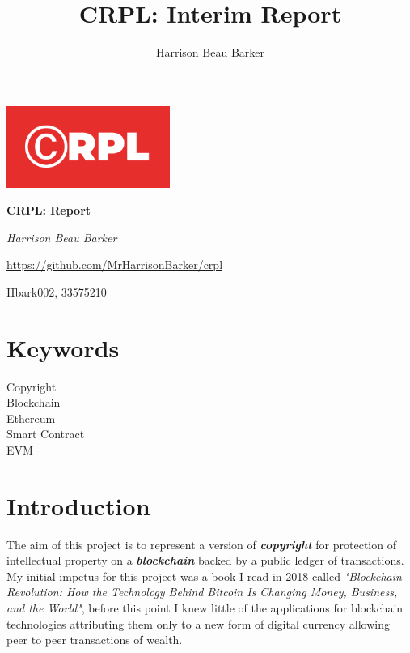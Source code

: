 \documentclass[12pt]{article}
\title{CRPL: Interim Report}
\author{Harrison Beau Barker}
\newcommand{\keyword}[1]{\textbf{\textit{#1}}}
\begin{document}
\begin{titlepage}
	\centering
	\includegraphics[width=0.4\textwidth]{crpl}\par
	\vspace{1cm}
	{\huge\bfseries CRPL: Report\par}
	\vspace{2cm}
	{\Large\itshape Harrison Beau Barker\par}
	\vfill
	{\url{https://github.com/MrHarrisonBarker/crpl}\par}
	\vspace{1cm}
	{\large Hbark002, 33575210\par}
\end{titlepage}


\tableofcontents{}

\section{Keywords}

\begin{description}
	\item[Copyright]
	\item[Blockchain]
	\item[Ethereum]
	\item[Smart Contract]
	\item[EVM] 
\end{description}

\section{Introduction}

The aim of this project is to represent a version of \keyword{copyright} for protection of intellectual property on a \keyword{blockchain} backed by a public ledger of transactions. My initial impetus for this project was a book I read in 2018 called \textit{"Blockchain Revolution: How the Technology Behind Bitcoin Is Changing Money, Business, and the World"}\cite{blockchain_revolution}, before this point I knew little of the applications for blockchain technologies attributing them only to a new form of digital currency allowing peer to peer transactions of wealth.
\end{document}
